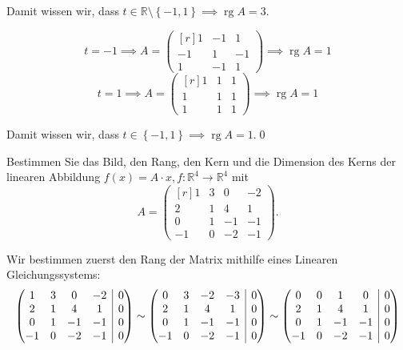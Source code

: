 \documentclass[answers]{exam}
\makeatletter
\newenvironment{sysmatrix}[1]
  {\left(\begin{array}{@{}#1@{}}}
  {\end{array}\right)}
\newcommand{\vektor}[1]{\begin{pmatrix*}[r] #1 \end{pmatrix*}}
\newcommand{\R}{\mathbb{R}}
\DeclareMathOperator{\rg}{rg}
\makeatother
\begin{document}
\begin{questions}
\begin{solution}
        Damit wissen wir, dass $t \in \R \setminus \left\{-1, 1\right\} \implies \rg A = 3$.

        $$
            t = -1 \implies A = \vektor{1 & -1 & 1 \\ -1 & 1 & -1 \\ 1 & -1 & 1} \implies \rg A = 1
        $$
        $$
            t = 1 \implies A = \vektor{1 & 1 & 1 \\ 1 & 1 & 1 \\ 1 & 1 & 1} \implies \rg A = 1
        $$

        Damit wissen wir, dass $t \in \left\{-1, 1\right\} \implies \rg A = 1$.\qed
    \end{solution}

    \newpage

    \question
    Bestimmen Sie das Bild, den Rang, den Kern und die Dimension des Kerns der linearen Abbildung $f(x) = A\cdot x, f : \R^4 \to \R^4$ mit
    $$
        A = \vektor{1 & 3 & 0 & -2 \\ 2 & 1 & 4 & 1 \\ 0 & 1 & -1 & -1 \\ -1 & 0 & -2 & -1}.
    $$
    \begin{solution}
        Wir bestimmen zuerst den Rang der Matrix mithilfe eines Linearen Gleichungssystems:
        $$
            \begin{sysmatrix}{cccc|c}
                1 & 3 & 0 & -2 & 0 \\
                2 & 1 & 4 & 1 & 0 \\
                0 & 1 & -1 & -1 & 0 \\
                -1 & 0 & -2 & -1 & 0
            \end{sysmatrix}
            \sim
            \begin{sysmatrix}{cccc|c}
                0 & 3 & -2 & -3 & 0 \\
                2 & 1 & 4 & 1 & 0 \\
                0 & 1 & -1 & -1 & 0 \\
                -1 & 0 & -2 & -1 & 0
            \end{sysmatrix}
            \sim
            \begin{sysmatrix}{cccc|c}
                0 & 0 & 1 & 0 & 0 \\
                2 & 1 & 4 & 1 & 0 \\
                0 & 1 & -1 & -1 & 0 \\
                -1 & 0 & -2 & -1 & 0
            \end{sysmatrix}
$$
\end{solution}
\end{questions}
\end{document}
